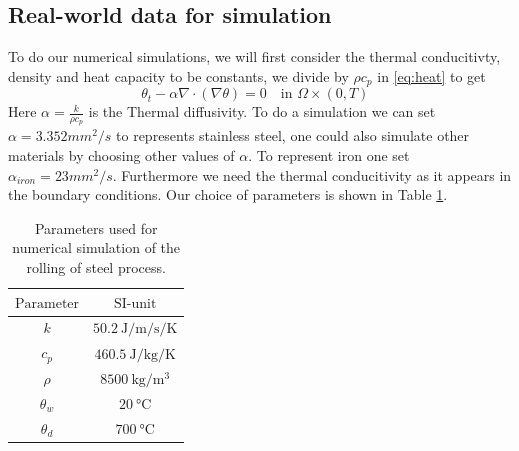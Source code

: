\subsection{Real-world data for simulation}

To do our numerical simulations, we will first consider the thermal conducitivty, density and heat capacity to be constants, we divide by $\rho c_p$ in \eqref{eq:heat} to get 
\begin{equation*}
    \theta_t - \alpha \nabla \cdot (\nabla \theta) = 0 \quad \text{in $\Omega \times (0,T)$ }
\end{equation*}
Here $\alpha = \frac{k}{\rho c_p}$ is the Thermal diffusivity. To do a simulation we can set $\alpha = 3.352 mm^2/s$ to represents stainless steel, one could also simulate other materials by choosing other values of $\alpha$. To represent iron one set $\alpha_{iron} = 23 mm^2/s$. Furthermore we need the thermal conducitivity as it appears in the boundary conditions. Our choice of parameters is shown in Table \ref{tab:chosenParam}.
\begin{table}[h]
    \centering
    \caption{Parameters used for numerical simulation of the rolling of steel process.}
    \begin{tabular}{c|c}
    $\text{Parameter}$ & $\text{SI-unit}$ \\
    \hline
       $k$& $\SI{50.2}{\joule\per\metre\per\second\per\kelvin}$ \\
        $c_p$ & $\SI{460.5}{\joule\per\kilogram\per\kelvin}$ \\
        $\rho$ & $\SI{8500}{\kilogram\per\metre\cubed}$ \\
        $\theta_w$ & $\SI{20}{\celsius}$ \\
        $\theta_d$ & $\SI{700}{\celsius}$ \\
    \end{tabular}
    \label{tab:chosenParam}
\end{table}

